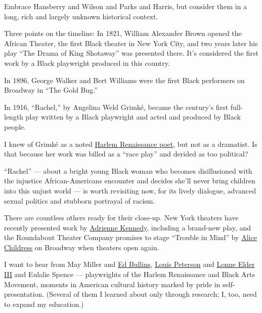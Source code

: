 Embrace Hansberry and Wilson and Parks and Harris, but consider them in
a long, rich and largely unknown historical context.

Three points on the timeline: In 1821, William Alexander Brown opened
the African Theater, the first Black theater in New York City, and two
years later his play ``The Drama of King Shotaway'' was presented there.
It's considered the first work by a Black playwright produced in this
country.

In 1896, George Walker and Bert Williams were the first Black performers
on Broadway in ``The Gold Bug.''

In 1916, ``Rachel,'' by Angelina Weld Grimké, became the century's first
full-length play written by a Black playwright and acted and produced by
Black people.

I knew of Grimké as a noted
\href{https://poets.org/poet/angelina-weld-grimke}{Harlem Renaissance
poet}, but not as a dramatist. Is that because her work was billed as a
``race play'' and derided as too political?

``Rachel'' --- about a bright young Black woman who becomes
disillusioned with the injustice African-Americans encounter and decides
she'll never bring children into this unjust world --- is worth
revisiting now, for its lively dialogue, advanced sexual politics and
stubborn portrayal of racism.

There are countless others ready for their close-up. New York theaters
have recently presented work by
\href{https://www.nytimes3xbfgragh.onion/2018/01/10/theater/adrienne-kennedy-playwright-still-quiet-still-bold-still-furious.html}{Adrienne
Kennedy}, including a brand-new play, and the Roundabout Theater Company
promises to stage ``Trouble in Mind'' by
\href{https://www.nytimes3xbfgragh.onion/1994/08/19/obituaries/alice-childress-77-a-novelist-drew-themes-from-black-life.html}{Alice
Childress} on Broadway when theaters open again.

I want to hear from May Miller and
\href{https://www.nytimes3xbfgragh.onion/1972/03/19/archives/bullins-its-not-the-play-i-wrote-bullins-its-not-the-play-i-wrote.html}{Ed
Bullins},
\href{https://www.nytimes3xbfgragh.onion/1998/05/01/arts/louis-peterson-76-playwright-who-opened-doors-for-blacks.html}{Louis
Peterson} and
\href{https://www.nytimes3xbfgragh.onion/1996/06/13/arts/lonne-elder-69-pioneering-playwright-dies.html}{Lonne
Elder III} and Eulalie Spence --- playwrights of the Harlem Renaissance
and Black Arts Movement, moments in American cultural history marked by
pride in self-presentation. (Several of them I learned about only
through research; I, too, need to expand my education.)

